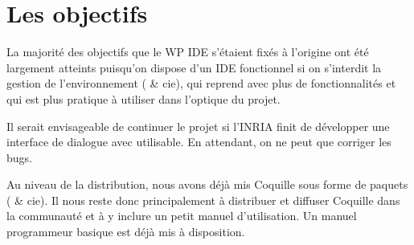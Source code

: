 \section{Les objectifs}

La majorité des objectifs que le WP IDE s'étaient fixés à l'origine ont été largement atteints puisqu'on dispose d'un IDE fonctionnel si on s'interdit la gestion de l'environnement ( \& cie),  qui reprend \coqide{} avec plus de fonctionnalités et qui est plus pratique à utiliser dans l'optique du projet.

Il serait envisageable de continuer le projet si l'INRIA finit de développer une interface de dialogue avec \coq{} utilisable.
En attendant, on ne peut que corriger les bugs.

Au niveau de la distribution, nous avons déjà mis Coquille sous forme de paquets ( \& cie). Il nous reste donc principalement à distribuer et diffuser Coquille dans la communauté \coq{} et à y inclure un petit manuel d'utilisation. Un manuel programmeur basique est déjà mis à disposition.

